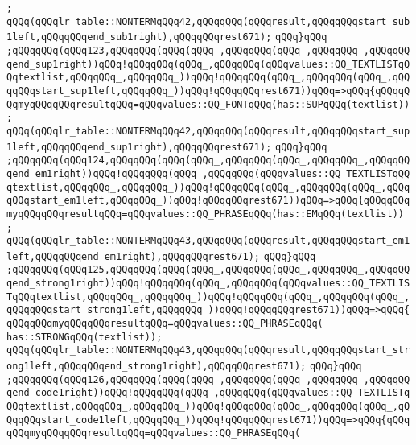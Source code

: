\verb|;|\newline
\verb|qQQq(qQQqlr_table::NONTERMqQQq42,qQQqqQQq(qQQqresult,qQQqqQQqstart_sub1left,qQQqqQQqend_sub1right),qQQqqQQqrest671);|\newline
\verb|qQQq}qQQq|\newline
\verb|;qQQqqQQq(qQQq123,qQQqqQQq(qQQq(qQQq_,qQQqqQQq(qQQq_,qQQqqQQq_,qQQqqQQqend_sup1right))qQQq!qQQqqQQq(qQQq_,qQQqqQQq(qQQqvalues::QQ_TEXTLISTqQQqtextlist,qQQqqQQq_,qQQqqQQq_))qQQq!qQQqqQQq(qQQq_,qQQqqQQq(qQQq_,qQQqqQQqstart_sup1left,qQQqqQQq_))qQQq!qQQqqQQqrest671))qQQq=>qQQq{qQQqqQQqmyqQQqqQQqresultqQQq=qQQqvalues::QQ_FONTqQQq(has::SUPqQQq(textlist))|\newline
\verb|;|\newline
\verb|qQQq(qQQqlr_table::NONTERMqQQq42,qQQqqQQq(qQQqresult,qQQqqQQqstart_sup1left,qQQqqQQqend_sup1right),qQQqqQQqrest671);|\newline
\verb|qQQq}qQQq|\newline
\verb|;qQQqqQQq(qQQq124,qQQqqQQq(qQQq(qQQq_,qQQqqQQq(qQQq_,qQQqqQQq_,qQQqqQQqend_em1right))qQQq!qQQqqQQq(qQQq_,qQQqqQQq(qQQqvalues::QQ_TEXTLISTqQQqtextlist,qQQqqQQq_,qQQqqQQq_))qQQq!qQQqqQQq(qQQq_,qQQqqQQq(qQQq_,qQQqqQQqstart_em1left,qQQqqQQq_))qQQq!qQQqqQQqrest671))qQQq=>qQQq{qQQqqQQqmyqQQqqQQqresultqQQq=qQQqvalues::QQ_PHRASEqQQq(has::EMqQQq(textlist))|\newline
\verb|;|\newline
\verb|qQQq(qQQqlr_table::NONTERMqQQq43,qQQqqQQq(qQQqresult,qQQqqQQqstart_em1left,qQQqqQQqend_em1right),qQQqqQQqrest671);|\newline
\verb|qQQq}qQQq|\newline
\verb|;qQQqqQQq(qQQq125,qQQqqQQq(qQQq(qQQq_,qQQqqQQq(qQQq_,qQQqqQQq_,qQQqqQQqend_strong1right))qQQq!qQQqqQQq(qQQq_,qQQqqQQq(qQQqvalues::QQ_TEXTLISTqQQqtextlist,qQQqqQQq_,qQQqqQQq_))qQQq!qQQqqQQq(qQQq_,qQQqqQQq(qQQq_,qQQqqQQqstart_strong1left,qQQqqQQq_))qQQq!qQQqqQQqrest671))qQQq=>qQQq{qQQqqQQqmyqQQqqQQqresultqQQq=qQQqvalues::QQ_PHRASEqQQq(|\newline
\verb|has::STRONGqQQq(textlist));|\newline
\verb|qQQq(qQQqlr_table::NONTERMqQQq43,qQQqqQQq(qQQqresult,qQQqqQQqstart_strong1left,qQQqqQQqend_strong1right),qQQqqQQqrest671);|\newline
\verb|qQQq}qQQq|\newline
\verb|;qQQqqQQq(qQQq126,qQQqqQQq(qQQq(qQQq_,qQQqqQQq(qQQq_,qQQqqQQq_,qQQqqQQqend_code1right))qQQq!qQQqqQQq(qQQq_,qQQqqQQq(qQQqvalues::QQ_TEXTLISTqQQqtextlist,qQQqqQQq_,qQQqqQQq_))qQQq!qQQqqQQq(qQQq_,qQQqqQQq(qQQq_,qQQqqQQqstart_code1left,qQQqqQQq_))qQQq!qQQqqQQqrest671))qQQq=>qQQq{qQQqqQQqmyqQQqqQQqresultqQQq=qQQqvalues::QQ_PHRASEqQQq(|\newline
